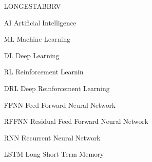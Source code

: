 \begin{theglossary}{LONGESTABBRV}
\item[AI] Artificial Intelligence
\item[ML] Machine Learning
\item[DL] Deep Learning
\item[RL] Reinforcement Learnin
\item[DRL] Deep Reinforcement Learning
\item[FFNN] Feed Forward Neural Network
\item[RFFNN] Residual Feed Forward Neural Network
\item[RNN] Recurrent Neural Network
\item[LSTM] Long Short Term Memory

\end{theglossary}
